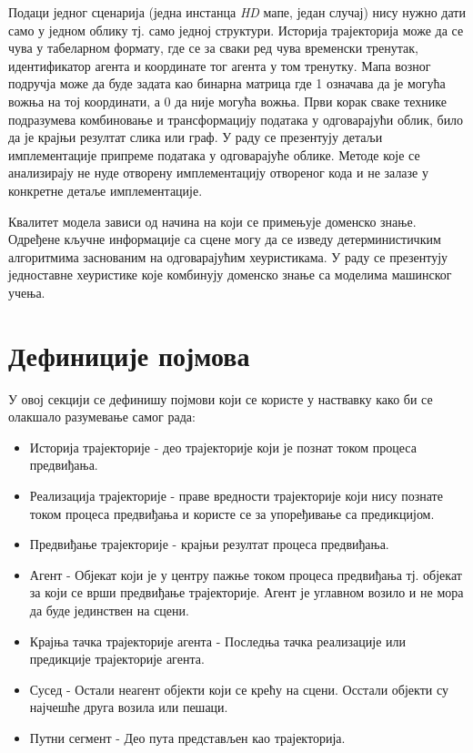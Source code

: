 \documentclass[11pt,oneside]{memoir}
\begin{document}
Подаци једног сценарија (једна инстанца \textit{HD} мапе, један случај) нису нужно дати само у једном облику 
тј. само једној структури. Историја
трајекторија може да се чува у табеларном формату, где се за сваки ред чува временски тренутак, идентификатор агента и координате
тог агента у том тренутку. Мапа возног подручја може да буде задата као бинарна матрица где 1 означава да је могућа вожња на тој координати, 
а 0 да није могућа вожња. Први корак
сваке технике подразумева комбиновање и трансформацију података у одговарајући облик, било да је крајњи резултат слика или граф. У раду
се презентују детаљи имплементације припреме података у одговарајуће облике. 
Методе које се анализирају не нуде отворену имплементацију отвореног кода и не залазе у конкретне детаље имплементације. 

Квалитет модела зависи од начина на који се примењује доменско знање. Одређене кључне информације
са сцене могу да се изведу детерминистичким алгоритмима заснованим на одговарајућим хеуристикама. У раду се презентују
једноставне хеуристике које комбинују доменско знање са моделима машинског учења.

\section{Дефиниције појмова}

У овој секцији се дефинишу појмови који се користе у наствавку како би се олакшало разумевање самог рада:
\begin{itemize}
  \item Историја трајекторије - део трајекторије који је познат током процеса предвиђања.
  \item Реализација трајекторије - праве вредности трајекторије који нису познате током процеса предвиђања и користе се за упоређивање са предикцијом.
  \item Предвиђање трајекторије - крајњи резултат процеса предвиђања.
  \item Агент - Објекат који је у центру пажње током процеса предвиђања тј. објекат за који се врши предвиђање трајекторије. 
        Агент је углавном возило и не мора да буде јединствен на сцени.
  \item Крајња тачка трајекторије агента - Последња тачка реализације или предикције трајекторије агента.
  \item Сусед - Остали неагент објекти који се крећу на сцени. Осстали објекти су најчешће друга возила или пешаци.
  \item Путни сегмент - Део пута представљен као трајекторија.
\end{itemize}
\end{document}
